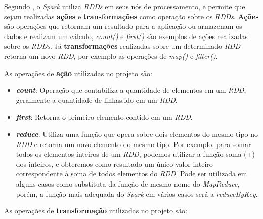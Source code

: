 Segundo \cite{LearningSparkAl}, o \textit{Spark} utiliza \textit{RDDs} em seus nós de processamento, e permite que sejam realizadas \textbf{ações} e \textbf{transformações} como operação sobre os \textit{RDDs}.  \textbf{Ações} são operações que retornam um resultado para a aplicação ou armazenam  os dados e realizam um cálculo, \textit{count()} e \textit{first()} são exemplos de ações realizadas sobre os \textit{RDDs}. Já \textbf{transformações} realizadas sobre um determinado \textit{RDD} retorna um novo \textit{RDD}, por exemplo as operações de \textit{map()} e \textit{filter()}.

As operações de \textbf{ação} utilizadas no projeto são:
\begin{itemize}
\item \textit{\textbf{count}}: Operação que contabiliza a quantidade de elementos em um \textit{RDD}, geralmente a quantidade de linhas.ido em um \textit{RDD}.
\item \textit{\textbf{first}}: Retorna o primeiro elemento contido em um \textit{RDD}.
\item \textit{\textbf{reduce}}: Utiliza uma função que opera sobre dois elementos do mesmo tipo no \textit{RDD} e retorna um novo elemento do mesmo tipo. Por exemplo, para somar todos os elementos inteiros de um \textit{RDD}, podemos utilizar a função soma (+) dos inteiros, e obteremos como resultado um único valor inteiro correspondente à soma de todos elementos do \textit{RDD}. Pode ser utilizada em alguns casos como substituta da função de mesmo nome do \textit{MapReduce}, porém, a função mais adequada do \textit{Spark} em vários casos será a \textit{reduceByKey}.
\end{itemize}
As operações de \textbf{transformação} utilizadas no projeto são:
